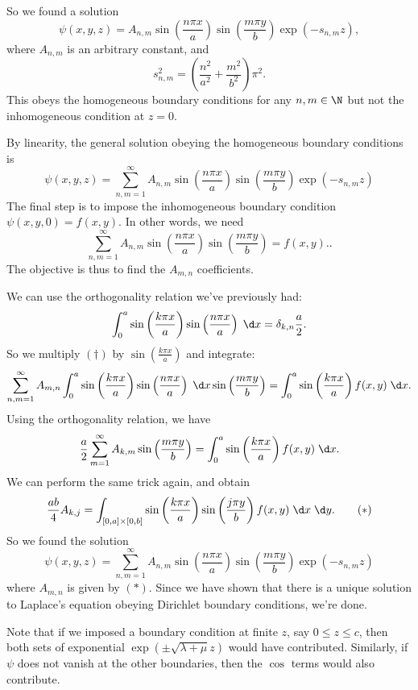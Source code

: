 \documentclass[a4paper]{article}
\begin{document}
So we found a solution
\[
  \psi(x, y, z) = A_{n, m}\sin \left(\frac{n\pi x}{a}\right) \sin \left(\frac{m\pi y}{b}\right) \exp(-s_{n, m} z),
\]
where $A_{n, m}$ is an arbitrary constant, and
\[
  s_{n, m}^2 = \left(\frac{n^2}{a^2} + \frac{m^2}{b^2}\right)\pi^2.
\]
This obeys the homogeneous boundary conditions for any $n, m \in \N$ but not the inhomogeneous condition at $z = 0$.

By linearity, the general solution obeying the homogeneous boundary conditions is
\[
  \psi(x, y, z) = \sum_{n, m = 1}^{\infty} A_{n, m} \sin\left(\frac{n\pi x}{a}\right) \sin \left(\frac{m\pi y}{b}\right) \exp(-s_{n, m} z)
\]
The final step is to impose the inhomogeneous boundary condition $\psi(x, y, 0) = f(x, y)$. In other words, we need
\[
  \sum_{n, m = 1}^{\infty} A_{n, m} \sin\left(\frac{n\pi x}{a}\right) \sin \left(\frac{m\pi y}{b}\right)  = f(x, y). \tag{$\dagger$}.
\]
The objective is thus to find the $A_{m, n}$ coefficients.

We can use the orthogonality relation we've previously had:
\[
  \int_0^a \sin\left(\frac{k\pi x}{a}\right) \sin \left(\frac{n\pi x}{a}\right)\;\d x = \delta_{k, n} \frac{a}{2}.
\]
So we multiply $(\dagger)$ by $\sin \left(\frac{k\pi x}{a}\right)$ and integrate:
\[
  \sum_{n, m = 1}^\infty A_{m, n}\int_0^a \sin \left(\frac{k\pi x}{a}\right) \sin \left(\frac{n\pi x}{a}\right)\;\d x \sin\left(\frac{m\pi y}{b}\right) = \int_0^a \sin\left(\frac{k \pi x}{a}\right)f(x, y) \;\d x.
\]
Using the orthogonality relation, we have
\[
  \frac{a}{2}\sum_{m = 1}^\infty A_{k, m} \sin\left(\frac{m\pi y}{b}\right) = \int_0^a \sin\left(\frac{k\pi x}{a}\right) f(x, y)\;\d x.
\]
We can perform the same trick again, and obtain
\[
  \frac{ab}{4}A_{k, j} = \int_{[0, a]\times [0, b]}\sin \left(\frac{k\pi x}{a}\right) \sin\left(\frac{j\pi y}{b}\right) f(x, y)\;\d x\;\d y.\tag{$*$}
\]
So we found the solution
\[
  \psi(x, y, z) = \sum_{n, m = 1}^{\infty} A_{n, m} \sin\left(\frac{n\pi x}{a}\right) \sin \left(\frac{m\pi y}{b}\right) \exp(-s_{n, m} z)
\]
where $A_{m, n}$ is given by $(*)$.  Since we have shown that there is a unique solution to Laplace's equation obeying Dirichlet boundary conditions, we're done.

Note that if we imposed a boundary condition at finite $z$, say $0 \leq z \leq c$, then both sets of exponential $\exp (\pm \sqrt{\lambda + \mu} z)$ would have contributed. Similarly, if $\psi$ does not vanish at the other boundaries, then the $\cos$ terms would also contribute.
\end{document}
